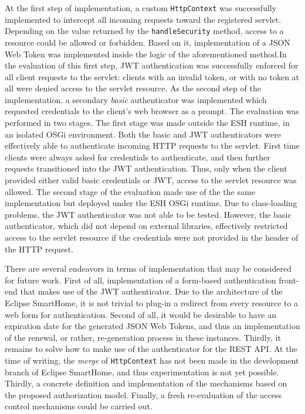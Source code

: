 \documentclass[12pt]{article}
\begin{document}
At the first step of implementation, a custom \texttt{HttpContext} was successfully implemented to intercept all incoming requests toward the registered servlet. Depending on the value returned by the \texttt{handleSecurity} method, access to a resource could be allowed or forbidden. Based on it, implementation of a JSON Web Token was implemented inside the logic of the aforementioned method.In the evaluation of this first step, JWT authentication was successfully enforced for all client requests to the servlet: clients with an invalid token, or with no token at all were denied access to the servlet resource. As the second step of the implementation, a secondary \emph{basic} authenticator was implemented which requested credentials to the client's web browser as a prompt. The evaluation was performed in two stages. The first stage was made outside the ESH runtime, in an isolated OSGi environment. Both the basic and JWT authenticators were effectively able to authenticate incoming HTTP requests to the servlet. First time clients were always asked for credentials to authenticate, and then further requests transitioned into the JWT authentication. Thus, only when the client provided either valid basic credentials or JWT, access to the servlet resource was allowed. The second stage of the evaluation made use of the the same implementation but deployed under the ESH OSGi runtime. Due to class-loading problems, the JWT authenticator was not able to be tested. However, the basic authenticator, which did not depend on external libraries, effectively restricted access to the servlet resource if the credentials were not provided in the header of the HTTP request.

There are several endeavors in terms of implementation that may be considered for future work. First of all, implementation of a form-based authentication front-end that makes use of the JWT authenticator. Due to the architecture of the Eclipse SmartHome, it is not trivial to plug-in a redirect from every resource to a web form for authentication. Second of all, it would be desirable to have an expiration date for the generated JSON Web Tokens, and thus an implementation of the renewal, or rather, re-generation process in these instances. Thirdly, it remains to solve how to make use of the authenticator for the REST API. At the time of writing, the \emph{merge} of \texttt{HttpContext} has not been made in the development branch of Eclipse SmartHome, and thus experimentation is not yet possible. Thirdly, a concrete definition and implementation of the mechanisms based on the proposed authorization model. Finally, a fresh re-evaluation of the access control mechanisms could be carried out.
\end{document}
